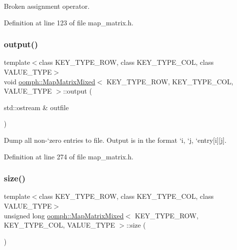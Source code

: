 Broken assignment operator. 



Definition at line 123 of file map\+\_\+matrix.\+h.

\mbox{\label{classoomph_1_1MapMatrixMixed_aa250e1584c330b589b2153dd5e170d31}} 
\subsubsection{\texorpdfstring{output()}{output()}}
{\footnotesize\ttfamily template$<$class K\+E\+Y\+\_\+\+T\+Y\+P\+E\+\_\+\+R\+OW, class K\+E\+Y\+\_\+\+T\+Y\+P\+E\+\_\+\+C\+OL, class V\+A\+L\+U\+E\+\_\+\+T\+Y\+PE$>$ \\
void \hyperlink{classoomph_1_1MapMatrixMixed}{oomph\+::\+Map\+Matrix\+Mixed}$<$ K\+E\+Y\+\_\+\+T\+Y\+P\+E\+\_\+\+R\+OW, K\+E\+Y\+\_\+\+T\+Y\+P\+E\+\_\+\+C\+OL, V\+A\+L\+U\+E\+\_\+\+T\+Y\+PE $>$\+::output (\begin{DoxyParamCaption}\item[{std\+::ostream \&}]{outfile }\end{DoxyParamCaption})\hspace{0.3cm}{\ttfamily [inline]}}



Dump all non-\/`zero\textquotesingle{} entries to file. Output is in the format `i\textquotesingle{}, `j\textquotesingle{}, `entry\mbox{[}i\mbox{]}\mbox{[}j\mbox{]}\textquotesingle{}. 



Definition at line 274 of file map\+\_\+matrix.\+h.

\mbox{\label{classoomph_1_1MapMatrixMixed_af26d8be251e0d02354d242f84622c1ff}} 
\subsubsection{\texorpdfstring{size()}{size()}\hspace{0.1cm}{\footnotesize\ttfamily [1/2]}}
{\footnotesize\ttfamily template$<$class K\+E\+Y\+\_\+\+T\+Y\+P\+E\+\_\+\+R\+OW, class K\+E\+Y\+\_\+\+T\+Y\+P\+E\+\_\+\+C\+OL, class V\+A\+L\+U\+E\+\_\+\+T\+Y\+PE$>$ \\
unsigned long \hyperlink{classoomph_1_1MapMatrixMixed}{oomph\+::\+Map\+Matrix\+Mixed}$<$ K\+E\+Y\+\_\+\+T\+Y\+P\+E\+\_\+\+R\+OW, K\+E\+Y\+\_\+\+T\+Y\+P\+E\+\_\+\+C\+OL, V\+A\+L\+U\+E\+\_\+\+T\+Y\+PE $>$\+::size (\begin{DoxyParamCaption}{ }\end{DoxyParamCaption})\hspace{0.3cm}{\ttfamily [inline]}}



